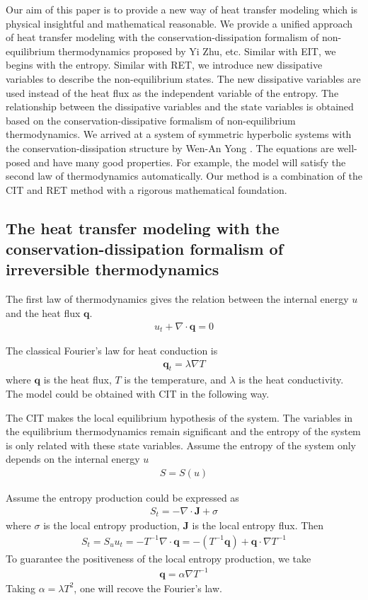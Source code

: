 \documentclass[a4paper]{article}
\begin{document}
Our aim of this paper is to provide a new way of heat transfer modeling which is physical insightful and mathematical reasonable. We provide a unified approach of heat transfer modeling with the conservation-dissipation formalism of non-equilibrium thermodynamics proposed by Yi Zhu, etc.\cite{zhu2014conservation} Similar with EIT, we begins with the entropy. Similar with RET, we introduce new dissipative variables to describe the non-equilibrium states. The new dissipative variables are used instead of the heat flux as the independent variable of the entropy. The relationship between the dissipative variables and the state variables is obtained based on the conservation-dissipative formalism of non-equilibrium thermodynamics. We arrived at a system of symmetric hyperbolic systems with the conservation-dissipation structure by Wen-An Yong \cite{yong2008interesting}. The equations are well-posed and have many good properties. For example, the  model will satisfy the second law of thermodynamics automatically. Our method is a combination of the CIT and RET method with a rigorous mathematical foundation. 


\subsection{The  heat transfer modeling with the conservation-dissipation formalism of irreversible thermodynamics}
The first law of thermodynamics gives the relation between the internal energy $u$ and the heat flux $\mathbf{q}$.
\begin{eqnarray}
u_t+\nabla \cdot \mathbf{q}=0
\end{eqnarray}

The classical Fourier's law for heat conduction is 
\begin{eqnarray}
\mathbf{q}_t=\lambda \nabla T
\end{eqnarray}
where $\mathbf{q}$ is the heat flux, $T$ is the temperature, and $\lambda$ is the heat conductivity. The model could be obtained with CIT in the following way.

The CIT makes the local equilibrium hypothesis of the system. The variables in the equilibrium thermodynamics remain significant and the entropy of the system is only related with these state variables. Assume the entropy of the system only depends on the internal energy $u$
\begin{eqnarray}
S=S(u)
\end{eqnarray}

Assume the entropy production could be expressed as 
\begin{eqnarray}
S_t=-\nabla \cdot \mathbf{J} + \sigma
\end{eqnarray}
where $\sigma$ is the local entropy production, $\mathbf{J}$ is the local entropy flux.
Then
\begin{eqnarray}
S_t=S_u u_t = -T^{-1} \nabla \cdot \mathbf{q} = -(T^{-1} \mathbf{q})+ \mathbf{q} \cdot \nabla T^{-1}
\end{eqnarray}
To guarantee the positiveness of the local entropy production, we take
\begin{eqnarray}
\mathbf{q}=\alpha \nabla T^{-1}
\end{eqnarray}
Taking $\alpha={\lambda}{T^2}$, one will recove the Fourier's law.
\end{document}
